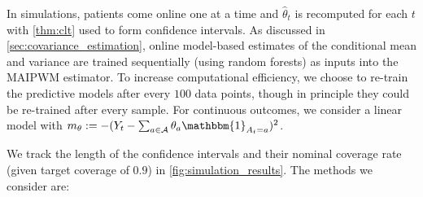 \documentclass[11pt]{article}
\begin{document}
In simulations, patients come online one at a time and $\hat{\theta}_{t}$ is recomputed for each $t$ with \cref{thm:clt} used to form confidence intervals. As discussed in \cref{sec:covariance_estimation}, online model-based estimates of the conditional mean and variance are trained sequentially (using random forests) as inputs into the MAIPWM estimator. To increase computational efficiency, we choose to re-train the predictive models after every $100$ data points, though in principle they could be re-trained after every sample. For continuous outcomes, we consider a linear model with $m_{\theta} :=- (Y_{t} - \sum_{a\in \mathcal{A}}\theta_{a} \mathbbm{1}_{A_t = a})^{2}$. %

We track the length of the confidence intervals and their nominal coverage rate (given target coverage of $0.9$) in \cref{fig:simulation_results}. The methods we consider are:
\end{document}
